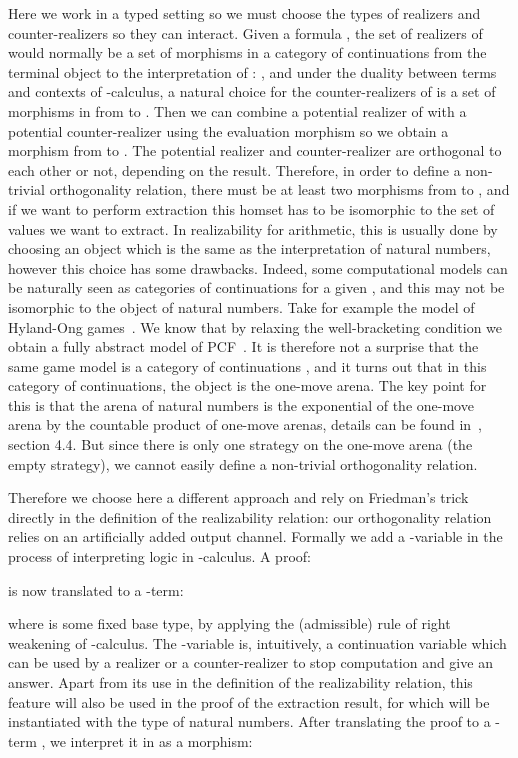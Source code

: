 \documentclass{CSML}
\begin{document}
Here we work in a typed setting so we must choose the types of realizers and counter-realizers so they can interact. Given a formula , the set of realizers of  would normally be a set of morphisms in a category of continuations  from the terminal object  to the interpretation of : , and under the duality between terms and contexts of -calculus, a natural choice for the counter-realizers of  is a set of morphisms in  from  to . Then we can combine a potential realizer of  with a potential counter-realizer using the evaluation morphism  so we obtain a morphism from  to . The potential realizer and counter-realizer are orthogonal to each other or not, depending on the result. Therefore, in order to define a non-trivial orthogonality relation, there must be at least two morphisms from  to , and if we want to perform extraction this homset has to be isomorphic to the set of values we want to extract. In realizability for arithmetic, this is usually done by choosing an object  which is the same as the interpretation of natural numbers, however this choice has some drawbacks. Indeed, some computational models can be naturally seen as categories of continuations for a given , and this  may not be isomorphic to the object of natural numbers. Take for example the model of Hyland-Ong games~\cite{HO}. We know that by relaxing the well-bracketing condition we obtain a fully abstract model of PCF~\cite{LairdControl}. It is therefore not a surprise that the same game model is a category of continuations , and it turns out that in this category of continuations, the object  is the one-move arena. The key point for this is that the arena of natural numbers is the exponential of the one-move arena by the countable product of one-move arenas, details can be found in~\cite{BlotThesis}, section 4.4. But since there is only one strategy on the one-move arena (the empty strategy), we cannot easily define a non-trivial orthogonality relation.\par
Therefore we choose here a different approach and rely on Friedman's trick directly in the definition of the realizability relation: our orthogonality relation relies on an artificially added output channel. Formally we add a -variable in the process of interpreting logic in -calculus. A proof:

is now translated to a -term:

where  is some fixed base type, by applying the (admissible) rule of right weakening of -calculus. The -variable  is, intuitively, a continuation variable which can be used by a realizer or a counter-realizer to stop computation and give an answer. Apart from its use in the definition of the realizability relation, this feature will also be used in the proof of the extraction result, for which  will be instantiated with the type of natural numbers. After translating the proof  to a -term , we interpret it in  as a morphism:
\end{document}
